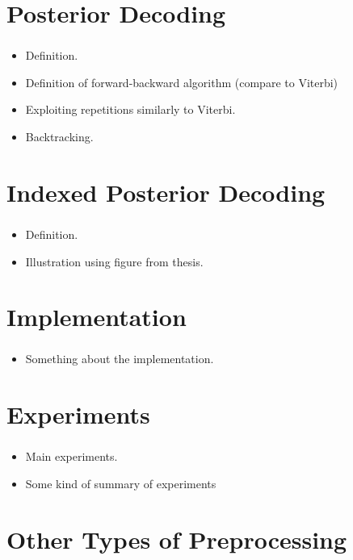 \documentclass[english,notes]{beamer}
\begin{document}
\section{Posterior Decoding}

\begin{frame}
  \frametitle{\insertsection}
  \begin{itemize}
    \tiny
  \item Definition.
  \item Definition of forward-backward algorithm (compare to Viterbi)
  \item Exploiting repetitions similarly to Viterbi.
  \item Backtracking.
  \end{itemize}
\end{frame}

\section{Indexed Posterior Decoding}

\begin{frame}
  \frametitle{\insertsection}
  \begin{itemize}
    \tiny
  \item Definition.
  \item Illustration using figure from thesis.
  \end{itemize}
\end{frame}

\section{Implementation}

\begin{frame}
  \frametitle{\insertsection}
  \begin{itemize}
    \tiny
  \item Something about the implementation.
  \end{itemize}
\end{frame}

\section{Experiments}

\begin{frame}
  \frametitle{\insertsection}
  \begin{itemize}
    \tiny
  \item Main experiments.
  \item Some kind of summary of experiments
  \end{itemize}
\end{frame}

\section{Other Types of Preprocessing}

\begin{frame}
  \frametitle{\insertsection}

\end{frame}
\end{document}
